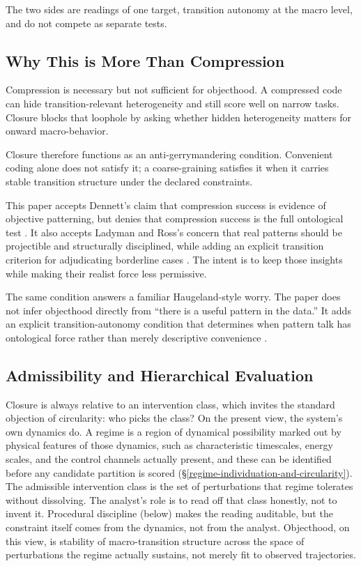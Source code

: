 The two sides are readings of one target, transition autonomy at the
macro level, and do not compete as separate tests.

\subsection{Why This is More Than
	Compression}\label{why-this-is-more-than-compression}

Compression is necessary but not sufficient for objecthood. A compressed
code can hide transition-relevant heterogeneity and still score well on
narrow tasks. Closure blocks that loophole by asking whether hidden
heterogeneity matters for onward macro-behavior.

Closure therefore functions as an anti-gerrymandering condition.
Convenient coding alone does not satisfy it; a coarse-graining satisfies
it when it carries stable transition structure under the declared
constraints.

This paper accepts Dennett's claim that compression
success is evidence of objective patterning, but denies that compression
success is the full ontological test \citep{dennett1991}. It also accepts
Ladyman and Ross's concern that real patterns should be projectible and
structurally disciplined, while adding an explicit transition criterion
for adjudicating borderline cases \citep{ladyman2007}. The intent is to
keep those insights while making their realist force less permissive.

The same condition answers a familiar Haugeland-style worry. The paper
does not infer objecthood directly from ``there is a useful pattern in
the data.'' It adds an explicit transition-autonomy condition that
determines when pattern talk has ontological force rather than merely
descriptive convenience \citep{haugeland1998}.

\subsection{Admissibility and Hierarchical
	Evaluation}\label{admissibility-and-hierarchical-evaluation}

Closure is always relative to an intervention class, which invites the
standard objection of circularity: who picks the class? On the present
view, the system's own dynamics do. A regime
is a region of dynamical possibility marked out by physical features of
those dynamics, such as characteristic timescales, energy scales, and
the control channels actually present, and these can be identified
before any candidate partition is scored
(\S\ref{regime-individuation-and-circularity}). The admissible
intervention class is the set of perturbations that regime tolerates
without dissolving. The analyst's role is to read off that class honestly, not to invent it. Procedural discipline (below) makes the reading auditable,
but the constraint itself comes from the dynamics, not from the
analyst. Objecthood, on this view, is stability of macro-transition
structure across the space of perturbations the regime actually
sustains, not merely fit to observed trajectories.

